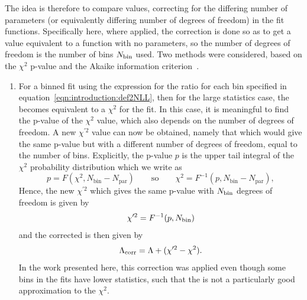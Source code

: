 The idea is therefore to compare \nll values,
correcting for the differing number of parameters
(or equivalently differing number of degrees of freedom) in
the fit functions. Specifically here, where applied, the correction is
done so as to get a value equivalent to a function with no parameters, so
the number of degrees of freedom is the number of bins $N_{\rm bin}$ used.
Two methods were considered, based on the
$\chi^2$ p-value and the Akaike information
criterion~\cite{ref:correction:akaike}.
\begin{enumerate}
\item %
For a binned fit using the expression for the \nll ratio
for each bin specified in equation~\ref{eqn:introduction:def2NLL}, then for
the large statistics case, the \nll becomes equivalent to a $\chi^2$ for the
fit. In this case, it is meaningful to find the p-value of the $\chi^2$ value,
which also depends on the number of degrees of freedom.
A new $\chi^{\prime 2}$
value can now be obtained, namely that which would give the same p-value but
with a different number of degrees of freedom,
equal to the number of bins.
Explicitly, the p-value $p$ is the upper 
tail integral of the $\chi^2$ probability
distribution which we write as
\begin{displaymath}
p = F(\chi^2,N_{\mathrm{bin}}-N_{\mathrm{par}})\qquad\mathrm{so}\qquad
\chi^2 = F^{-1}(p,N_{\mathrm{bin}}-N_{\mathrm{par}}),
\end{displaymath}
Hence, the new $\chi^{\prime 2}$ which gives the same p-value with
$N_{\rm bin}$ degrees of freedom is given by
\begin{displaymath}
\chi^{\prime 2} = F^{-1}(p,N_{\rm bin})
\end{displaymath}
and the corrected \nll is then given by
\begin{displaymath}
\Lambda_{\mathrm{corr}} = \textrm{\ensuremath{\Lambda}} + (\chi^{\prime 2} - \chi^2).
\end{displaymath}
In the work presented here, 
this correction was applied even though some bins in the fits
have lower statistics,
such that the \nll is not a particularly good approximation to the $\chi^2$.


\end{enumerate}
